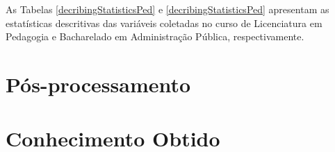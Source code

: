 \begin{figure}[!htb]
  \vspace{1.5em}
  \Ididthis
\end{figure}

As Tabelas \ref{decribingStatisticsPed} e \ref{decribingStatisticsPed}
apresentam as estatísticas descritivas das variáveis coletadas no curso de
Licenciatura em Pedagogia e Bacharelado em Administração Pública,
respectivamente.

\section{Pós-processamento}

\section{Conhecimento Obtido}
